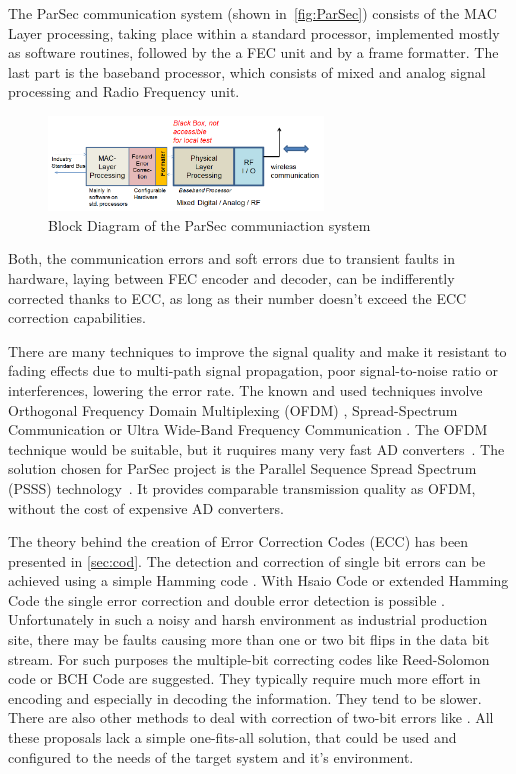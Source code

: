 The ParSec communication system (shown in~\autoref{fig:ParSec}) consists of the MAC Layer processing, taking place within a standard processor, implemented mostly as software routines, followed by the a FEC unit and by a frame formatter. The last part is the baseband processor, which consists of mixed and analog signal processing and Radio Frequency unit. 

\begin{figure}[h]
\centering
\includegraphics[width=0.65\textwidth]{figures/ParSec.png}
\caption{Block Diagram of the ParSec communiaction system}
\label{fig:ParSec}
\end{figure}

Both, the communication errors and soft errors due to transient faults in hardware, laying between FEC encoder and decoder, can be indifferently corrected thanks to ECC, as long as their number doesn't exceed the ECC correction capabilities. 

There are many techniques to improve the signal quality and make it resistant to fading effects due to multi-path signal propagation, poor signal-to-noise ratio or interferences, lowering the error rate. The known and used techniques involve Orthogonal Frequency Domain Multiplexing (OFDM) \cite{book:OFDM,art:OFDM}, Spread-Spectrum Communication \cite{art:spread-spectrum96,art:spread-spectrum97} or Ultra Wide-Band Frequency Communication \cite{book:ultra-wide08,book:ultra-wide04}. The OFDM technique would be suitable, but it ruquires many very fast AD converters~\cite{art:PSSS04}. The solution chosen for ParSec project is the Parallel Sequence Spread Spectrum (PSSS) technology~\cite{art:PSSS15,art:PSSS04,patent}. It provides comparable transmission quality as OFDM, without the cost of expensive AD converters.

The theory behind the creation of Error Correction Codes (ECC) has been presented in \autoref{sec:cod}. The detection and correction of single bit errors can be achieved using a simple Hamming code \cite{art:Hamming}. With Hsaio Code or extended Hamming Code the single error correction and double error detection is possible \cite{book:Fujiwara,art:Hsiao}. Unfortunately in such a noisy and harsh environment as industrial production site, there may be faults causing more than one or two bit flips in the data bit stream. For such purposes the multiple-bit correcting codes like Reed-Solomon code \cite{art:Reed-Solomon} or BCH Code \cite{art:BCH} are suggested. They typically require much more effort in  encoding and especially in decoding the information. They tend to be slower. There are also other methods to deal with correction of two-bit errors like \cite{art:Hosp, art:Varghese}. All these proposals lack a simple one-fits-all solution, that could be used and configured to the needs of the target system and it's environment.


